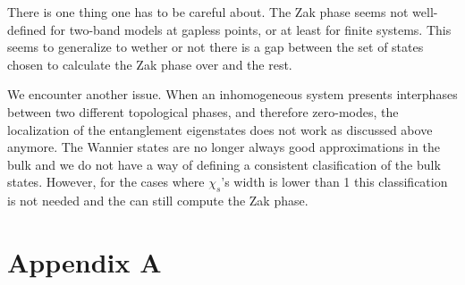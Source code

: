 \documentclass[twocolumn,amsmath,longbibliography,amssymb,superscriptaddress]{revtex4-1}
\begin{document}
There is one thing one has to be careful about. The Zak phase seems not well-defined for two-band models at gapless points, or at least for finite systems. This seems to generalize to wether or not there is a gap between the set of states chosen to calculate the Zak phase over and the rest.

We encounter another issue. When an inhomogeneous system presents interphases between two different topological phases, and therefore zero-modes, the localization of the entanglement eigenstates does not work as discussed above anymore. The Wannier states are no longer always good approximations in the bulk and we do not have a way of defining a consistent clasification of the bulk states. However, for the cases where $\chi_s$'s width is lower than 1 this classification is not needed and the can still compute the Zak phase.

	

	
\appendix

\section{Appendix A}
	
\end{document}
